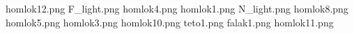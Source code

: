 homlok12.png
F_light.png
homlok4.png
homlok1.png
N_light.png
homlok8.png
homlok5.png
homlok3.png
homlok10.png
teto1.png
falak1.png
homlok11.png

